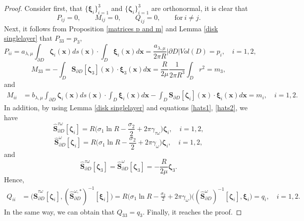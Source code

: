 \documentclass[10pt,a4paper]{amsart}
\begin{document}
\begin{proof}
Consider first, that $\{\boldsymbol{\xi}_i\}_{i=1}^{3}$ and $\{\boldsymbol{\zeta}_i\}_{i=1}^{3}$ are orthonormal, it is clear that
\begin{equation}
P_{ij}=0,\quad \quad M_{ij}=0, \quad \quad Q_{ij}=0, \quad\quad\text{for} \ i\neq j. \nonumber
\end{equation}
Next, it follows from Proposition \ref{matrices p and m} and Lemma \ref{disk singlelayer} that $P_{33}=p_3$,
$$
P_{ii}=a_{\lambda,\mu}\int_{ \partial D}\boldsymbol{\zeta}_i(\mathbf{x})ds(\mathbf{x})\cdot \int_{ D}\boldsymbol{\xi}_i(\mathbf{x})d\mathbf{x}
=\frac{{a}_{\lambda,\mu}}{2\pi R}|\partial D|Vol(D)=p_i,\quad i=1,2,
$$
$$
M_{33}=-\int_{ D} {\mathbf{S}}_{\partial D}[\boldsymbol{\zeta}_3](\mathbf{x}) \cdot \boldsymbol{\xi}_3(\mathbf{x}) d\mathbf{x}
=\frac{R}{2\mu}\frac{1}{2\pi R^3}\int_{D}r^2=m_3,
$$
and
\begin{align}
M_{ii}&={b}_{\lambda,\mu}\int_{ \partial D}\boldsymbol{\zeta}_i(\mathbf{x})ds(\mathbf{x}) \cdot\int_{ D}\boldsymbol{\xi}_i(\mathbf{x})d\mathbf{x}
-\int_{ D} {\mathbf{S}}_{\partial D}[\boldsymbol{\zeta}_i](\mathbf{x}) \cdot \boldsymbol{\xi}_i(\mathbf{x}) d\mathbf{x}=m_i,\quad i=1,2.\nonumber
\end{align}
In addition, by using Lemma \ref{disk singlelayer} and equations \eqref{hats1}, \eqref{hats2}, we have
$$
\hat{\mathbf{S}}_{\partial D}^{{\tau\omega} }[\boldsymbol{\zeta}_i]=R\Big(\sigma_{1}\ln{R}-\frac{\sigma_2}{2}+2\pi \gamma_{\tau\omega}\Big)\boldsymbol{\zeta}_i,\quad i=1,2,
$$
$$
\hat{\mathbf{S}}_{\partial D}^{{\omega} }[\boldsymbol{\zeta}_i]=R\Big(\sigma_{1}\ln{R}-\frac{\sigma_2}{2}+2\pi \gamma_{\omega}\Big)\boldsymbol{\zeta}_i,\quad i=1,2,
$$
and
$$
\hat{\mathbf{S}}_{\partial D}^{{\tau\omega} }[\boldsymbol{\zeta}_3]=\hat{\mathbf{S}}_{\partial D}^{{\omega} }[\boldsymbol{\zeta}_3]={-\frac{R}{2\mu}}\boldsymbol{\zeta}_3.
$$
Hence,
\begin{align}
Q_{ii}&=\Big(\hat{\mathbf{S}}_{\partial D}^{{\tau\omega} }[\boldsymbol{\zeta}_i],(\hat{\mathbf{S}}_{\partial D}^{{\omega},* })^{-1}[\boldsymbol{\xi}_i]\Big)=R\Big(\sigma_{1}\ln{R}-\frac{\sigma_2}{2}+2\pi \gamma_{\omega}\Big)\Big((\hat{\mathbf{S}}_{\partial D}^{{\omega}})^{-1}[\boldsymbol{\zeta}_i],\boldsymbol{\xi}_i\Big)=q_i,\quad i=1,2.\nonumber
\end{align}
In the same way, we can obtain that $Q_{33}=q_3$. Finally, it reaches the proof.
\end{proof}
\end{document}
